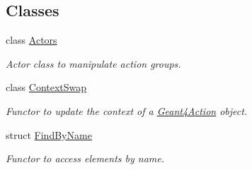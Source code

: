 \subsection*{Classes}
\begin{DoxyCompactItemize}
\item 
class \hyperlink{class_d_d4hep_1_1_simulation_1_1_geant4_action_1_1_actors}{Actors}
\begin{DoxyCompactList}\small\item\em Actor class to manipulate action groups. \end{DoxyCompactList}\item 
class \hyperlink{class_d_d4hep_1_1_simulation_1_1_geant4_action_1_1_context_swap}{Context\+Swap}
\begin{DoxyCompactList}\small\item\em Functor to update the context of a \hyperlink{class_d_d4hep_1_1_simulation_1_1_geant4_action}{Geant4\+Action} object. \end{DoxyCompactList}\item 
struct \hyperlink{struct_d_d4hep_1_1_simulation_1_1_geant4_action_1_1_find_by_name}{Find\+By\+Name}
\begin{DoxyCompactList}\small\item\em Functor to access elements by name. \end{DoxyCompactList}\end{DoxyCompactItemize}

